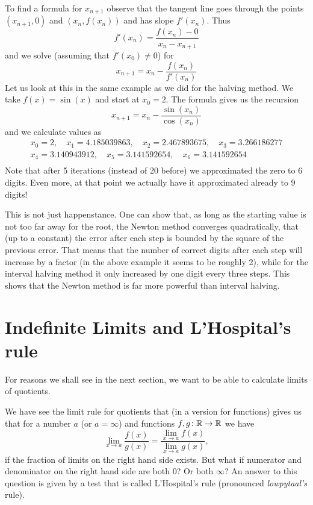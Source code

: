 To find a formula for $x_{n+1}$ observe that the tangent line goes through
the points $(x_{n+1},0)$ and $(x_n,f(x_n))$ and has slope $f'(x_n)$. Thus
\[
f'(x_n)=\frac{f(x_n)-0}{x_n-x_{n+1}}
\]
and we solve (assuming that $f'(x_0)\not=0$) for
\[
x_{n+1}=x_n-\frac{f(x_n)}{f'(x_n)}
\]
Let us look at this in the same example as we did for the halving method. We
take $f(x)=\sin(x)$ and start at $x_0=2$. The formula gives us the recursion
\[
x_{n+1}=x_n-\frac{\sin(x_n)}{\cos(x_n)}
\]
and we calculate values as
\begin{eqnarray*}
&x_0=2, \quad x_1=4.185039863,\quad x_2=2.467893675, \quad x_3=3.266186277&\\
&x_4=3.140943912, \quad x_5=3.141592654,\quad x_6=3.141592654&\\
\end{eqnarray*}
Note that after 5 iterations (instead of 20 before) we approximated the zero
to $6$ digits. Even more, at that point we actually have it approximated
already to 9 digits!

This is not just happenstance. One can show that, as long as the starting
value is not too far away for the root, the Newton method converges
quadratically, that (up to a constant) the error after each step is bounded
by the square of the previous error. That means that the number of correct
digits after each step will increase by a factor (in the above example it
seems to be roughly 2), while for the interval halving method it only
increased by one digit every three steps. This shows that the Newton
method is far more powerful than interval halving.


\section{Indefinite Limits and L'Hospital's rule}

For reasons we shall see in the next section, we want to be able to
calculate limits of quotients.

We have see the limit rule for quotients that (in a version for
functions) gives us that for a number $a$ (or $a=\infty$) and functions
$f,g\colon{\mathbb R}\to{\mathbb R}$ we have
\[
\lim_{x\to a}\frac{f(x)}{g(x)}=\frac{\lim_{x\to a}f(x)}{\lim_{x\to a}g(x)},
\]
if the fraction of limits on the right hand side exists. But what if
numerator and denominator on the right hand side are both $0$? Or both
$\infty$? An answer to this question is given by a test that is
called
L'Hospital's rule (pronounced {\em lowpytaal's} rule).

